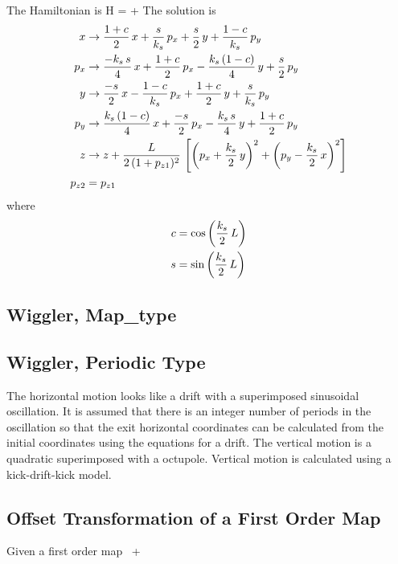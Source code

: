 \documentclass{book}
\begin{document}
The Hamiltonian is
\Begineq
  H =  + 
\Endeq
The solution is
\begin{align}
  x   &\rightarrow \frac{1 + c}{2} \, x + \frac{s}{k_s} \, p_x +
           \frac{s}{2} \, y + \frac{1 - c}{k_s} \, p_y \nonumber \\
  p_x &\rightarrow \frac{-k_s \, s}{4} \, x + \frac{1 + c}{2} \, p_x - 
           \frac{k_s \, (1 - c)}{4} \, y + \frac{s}{2} \, p_y \nonumber \\
  y   &\rightarrow \frac{-s}{2} \, x - \frac{1 - c}{k_s} \, p_x +
           \frac{1 + c}{2} \, y + \frac{s}{k_s} \, p_y \\      
  p_y &\rightarrow \frac{k_s \, (1 - c)}{4} \, x + \frac{-s}{2} \, p_x -
            \frac{k_s \, s}{4} \, y + \frac{1 + c}{2} \, p_y \nonumber \\ 
  z   &\rightarrow z + \frac{L}{2 \, (1 + p_{z1})^2} \, 
                   \left[ \left( p_x + \frac{k_s}{2} \, y \right)^2 +
                          \left( p_y - \frac{k_s}{2} \, x \right)^2 \right] \nonumber \\
  p_{z2} &= p_{z1} \nonumber
\end{align}
where
\begin{align}
  c &= \cos \left( \frac{k_s}{2} \, L \right) \nonumber \\
  s &= \sin \left( \frac{k_s}{2} \, L \right)
\end{align}

\subsection{Wiggler, Map\_type}



\subsection{Wiggler, Periodic Type}

The horizontal motion looks like a drift with a superimposed
sinusoidal oscillation. It is assumed that there is an integer number
of periods in the oscillation so that the exit horizontal coordinates
can be calculated from the initial coordinates using the equations for
a drift. The vertical motion is a quadratic superimposed with a
octupole. Vertical motion is calculated using a kick-drift-kick model.

\subsection{Offset Transformation of a First Order Map}

Given a first order map
\Begineq
  \bfr \rightarrow \bfr \, \bfM + \bfK
\Endeq
\end{document}
